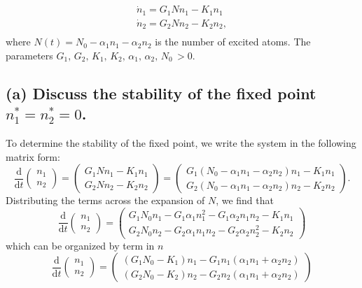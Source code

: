 \documentclass[draft]{agujournal2019}
\begin{document}
\begin{align*}
    \dot n_1 = G_1 N n_1 - K_1 n_1 \\
    \dot n_2 = G_2 N n_2 - K_2 n_2,\\
\end{align*}
where $N(t) = N_0 - \alpha_1 n_1 - \alpha_2 n_2$ is the number of excited atoms. The parameters $G_1,\,G_2,\,K_1,\,K_2,\,\alpha_1,\,\alpha_2,\,N_0 \,>0$. 



\subsection{(a) Discuss the stability of the fixed point $n_1^* = n_2^* = 0$.}
\label{ssec:p7a}

To determine the stability of the fixed point, we write the system in the following matrix form:
\begin{equation*}
    \frac{\mathrm{d}}{\mathrm{d}t} \begin{pmatrix} n_1 \\ n_2 \end{pmatrix}
    = \begin{pmatrix} G_1 N n_1 - K_1 n_1\\ G_2 Nn_2 - K_2 n_2 \end{pmatrix}
    = \begin{pmatrix} G_1 (N_0 - \alpha_1 n_1 - \alpha_2 n_2 ) n_1 - K_1 n_1\\ G_2 (N_0 - \alpha_1 n_1 - \alpha_2 n_2 ) n_2 - K_2 n_2 \end{pmatrix} .
\end{equation*}
Distributing the terms across the expansion of $N$, we find that 
\begin{equation*}
    \frac{\mathrm{d}}{\mathrm{d}t} \begin{pmatrix} n_1 \\ n_2 \end{pmatrix}
    = \begin{pmatrix} G_1 N_0 n_1 - G_1 \alpha_1 n_1^2 - G_1 \alpha_2 n_1 n_2  - K_1 n_1\\ G_2 N_0 n_2 - G_2 \alpha_1 n_1 n_2 - G_2 \alpha_2 n_2^2  - K_2 n_2 \end{pmatrix}
\end{equation*}
which can be organized by term in $n$
\begin{equation*}
    \frac{\mathrm{d}}{\mathrm{d}t} \begin{pmatrix} n_1 \\ n_2 \end{pmatrix}
    = \begin{pmatrix} (G_1 N_0 -K_1)n_1 - G_1 n_1 ( \alpha_1 n_1 +  \alpha_2 n_2 ) \\ 
    (G_2 N_0 - K_2 )n_2 - G_2 n_2 (\alpha_1 n_1 + \alpha_2 n_2) \end{pmatrix}
\end{equation*}
\end{document}
